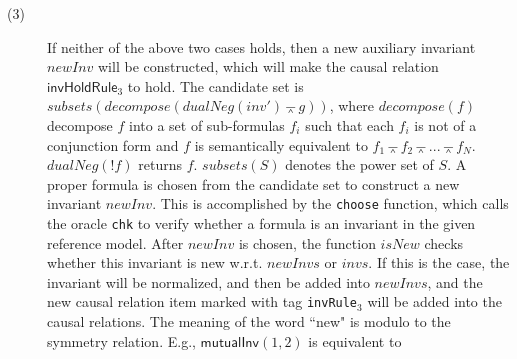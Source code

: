 \documentclass[final]{IEEEtran}
\def \eqc {\doteq }
\def \andc {\barwedge }
\def \negc {!}
\begin{document}
\begin{description}
\item[(3)] If neither of the above two cases holds, then a new auxiliary invariant $newInv$ will be constructed, which will make the causal relation $ \mathsf{invHoldRule}_3$  to hold. The candidate set is $subsets(decompose(dualNeg(inv')\andc g))$, where $decompose(f)$ decompose $f$ into a set of sub-formulas $f_i$  such that each $f_i$ is not of a conjunction form and $f$   is semantically equivalent to $f_1 \andc f_2 \andc ... \andc f_N$. $dualNeg(\negc f)$ returns $f$. $subsets(S)$ denotes the power set of $S$.
A proper formula is chosen from the candidate set to construct a new invariant $newInv$. This is accomplished by the {\tt choose} function, which calls the oracle {\tt chk} to verify whether a formula is an invariant in the given reference model. After $newInv$ is chosen, the function $isNew$ checks whether this invariant is new w.r.t. $newInvs$ or $invs$. If this is the case, the invariant will be normalized, and then be  added into $newInvs$, and the new causal relation item marked with tag {\tt invRule$_3$} will be added into the causal relations. The meaning of the word ``new" is modulo to the symmetry relation. E.g., $\mathsf{mutualInv}(1,2)$ is equivalent to

\end{description}
\end{document}
